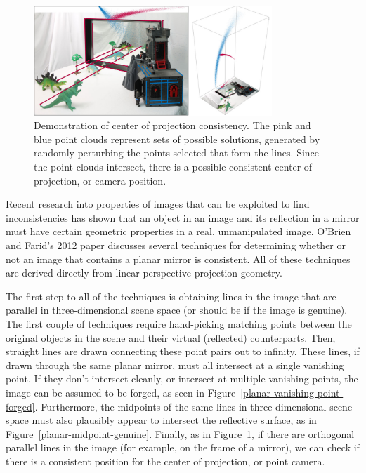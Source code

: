 \documentclass{thesis}
\begin{document}
\begin{figure}[h]
	\centering
    	\includegraphics[width=0.8\textwidth]{center-of-projection-planar-genuine}
	\caption{Demonstration of center of projection consistency. The pink and blue point clouds represent sets of possible solutions, generated by randomly perturbing the points selected that form the lines. Since the point clouds intersect, there is a possible consistent center of projection, or camera position. \cite[Fig.~6]{obrien12}}
	\label{center-of-projection-planar-genuine}
\end{figure}

Recent research into properties of images that can be exploited to find inconsistencies has shown that an object in an image and its reflection in a mirror must have certain geometric properties in a real, unmanipulated image. O'Brien and Farid's 2012 paper discusses several techniques for determining whether or not an image that contains a planar mirror is consistent.\nocite{obrien12} All of these techniques are derived directly from linear perspective projection geometry.

The first step to all of the techniques is obtaining lines in the image that are parallel in three-dimensional scene space (or should be if the image is genuine). The first couple of techniques require hand-picking matching points between the original objects in the scene and their virtual (reflected) counterparts. Then, straight lines are drawn connecting these point pairs out to infinity. These lines, if drawn through the same planar mirror, must all intersect at a single vanishing point. If they don't intersect cleanly, or intersect at multiple vanishing points, the image can be assumed to be forged, as seen in Figure~\ref{planar-vanishing-point-forged}. Furthermore, the midpoints of the same lines in three-dimensional scene space must also plausibly appear to intersect the reflective surface, as in Figure~\ref{planar-midpoint-genuine}. Finally, as in Figure~\ref{center-of-projection-planar-genuine}, if there are orthogonal parallel lines in the image (for example, on the frame of a mirror), we can check if there is a consistent position for the center of projection, or point camera.
\end{document}
